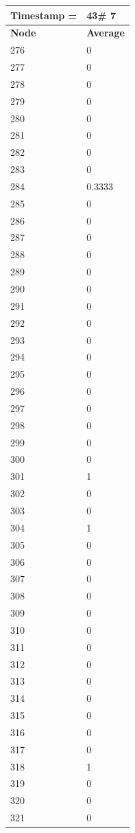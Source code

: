 \begin{tabular}{|l||l|}
\hline
\textbf{Timestamp =} & \textbf{43}\# 7\\\hline
	\textbf{Node} & \textbf{Average} \\ \hline
\hline
	276 & 0 \\ \hline
	277 & 0 \\ \hline
	278 & 0 \\ \hline
	279 & 0 \\ \hline
	280 & 0 \\ \hline
	281 & 0 \\ \hline
	282 & 0 \\ \hline
	283 & 0 \\ \hline
	284 & 0.3333 \\ \hline
	285 & 0 \\ \hline
	286 & 0 \\ \hline
	287 & 0 \\ \hline
	288 & 0 \\ \hline
	289 & 0 \\ \hline
	290 & 0 \\ \hline
	291 & 0 \\ \hline
	292 & 0 \\ \hline
	293 & 0 \\ \hline
	294 & 0 \\ \hline
	295 & 0 \\ \hline
	296 & 0 \\ \hline
	297 & 0 \\ \hline
	298 & 0 \\ \hline
	299 & 0 \\ \hline
	300 & 0 \\ \hline
	301 & 1 \\ \hline
	302 & 0 \\ \hline
	303 & 0 \\ \hline
	304 & 1 \\ \hline
	305 & 0 \\ \hline
	306 & 0 \\ \hline
	307 & 0 \\ \hline
	308 & 0 \\ \hline
	309 & 0 \\ \hline
	310 & 0 \\ \hline
	311 & 0 \\ \hline
	312 & 0 \\ \hline
	313 & 0 \\ \hline
	314 & 0 \\ \hline
	315 & 0 \\ \hline
	316 & 0 \\ \hline
	317 & 0 \\ \hline
	318 & 1 \\ \hline
	319 & 0 \\ \hline
	320 & 0 \\ \hline
	321 & 0 \\ \hline
\end{tabular}
